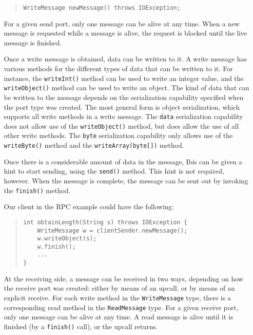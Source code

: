 \documentclass[10pt]{article}
\begin{document}
{\small
\begin{quote}
\begin{verbatim}
WriteMessage newMessage() throws IOException;
\end{verbatim}
\end{quote}
}

\noindent
For a given send port, only one message can be alive at any time.
When a new message is requested while a message is alive, the request
is blocked until the live message is finished.

Once a write message is obtained, data can be written to it.
A write message has various methods for the different types of
data that can be written to it. For instance, the
\texttt{writeInt()} method can be used to write an integer value,
and the \texttt{writeObject()} method can be used to write an object.
The kind of data that can be written to the message depends on the
serialization capability specified when the port type was created.
The most general form is object serialization, which supports 
all write methods in a write message.
The \texttt{data} serialization capability does not allow use of the
\texttt{writeObject()} method, but does allow the use of all other write
methods. The \texttt{byte} serialization capability only allows use
of the \texttt{writeByte()} method and the \texttt{writeArray(byte[])}
method.

Once there is a considerable amount of data in the message, Ibis
can be given a hint to start sending, using the \texttt{send()}
method. This hint is not required, however. When the message is
complete, the message can be sent out by invoking the
\texttt{finish()} method.

Our client in the RPC example could have the following:
{\small
\begin{quote}
\begin{verbatim}
int obtainLength(String s) throws IOException {
    WriteMessage w = clientSender.newMessage();
    w.writeObject(s);
    w.finish();
    ...
}
\end{verbatim}
\end{quote}
}

\noindent
At the receiving side, a message can be received in two ways,
depending on how the receive port was created: either by means of an
upcall, or by means of an explicit receive. For each write method
in the \texttt{WriteMessage} type, there is a corresponding read method in
the \texttt{ReadMessage} type. For a given receive port, only one message can
be alive at any time. A read message is alive until it is
finished (by a \texttt{finish()} call), or the upcall returns.
\end{document}
